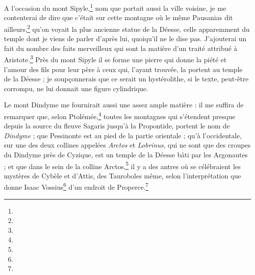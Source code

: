 \documentclass[a4paper, 11pt, oneside, polutonikogreek, french]{article}
\begin{document}
A l'occasion du mont Sipyle,\footnote{} nom que portait aussi la ville voisine, je me contenterai de dire que c'était sur cette montagne où le même Pausanias dit ailleurs,\footnote{} qu'on voyait la plus ancienne statue de la Déesse, celle apparemment du temple dont je viens de parler d'après lui, quoiqu'il ne le dise pas. J'ajouterai un fait du nombre des faits merveilleux qui sont la matière d'un traité attribué à Aristote.\footnote{} Près du mont Sipyle il se forme une pierre qui donne la piété et l'amour des fils pour leur père à ceux qui, l'ayant trouvée, la portent au temple de la Déesse ; je soupçonnerais que ce serait un hystérolithe, si le texte, peut-être corrompu, ne lui donnait une figure cylindrique.

Le mont Dindyme me fournirait aussi une assez ample matière : il me suffira de remarquer que, selon Ptolémée,\footnote{} toutes les montagnes qui s'étendent presque depuis la source du fleuve Sagaris jusqu'à la Propontide, portent le nom de \emph{Dindyme} ; que Pessinonte est au pied de la partie orientale ; qu'à l'occidentale, sur une des deux collines appelées \emph{Arctos} et \emph{Lobrinus}, qui ne sont que des croupes du Dindyme près de Cyzique, est un temple de la Déesse bâti par les Argonautes ; et que dans le sein de la colline Arctos,\footnote{} il y a des antres où se célébraient les mystères de Cybèle et d'Attis, des Tauroboles même, selon l'interprétation que donne Isaac Vossius\footnote{} d'un endroit de Properce.\footnote{}
\end{document}
